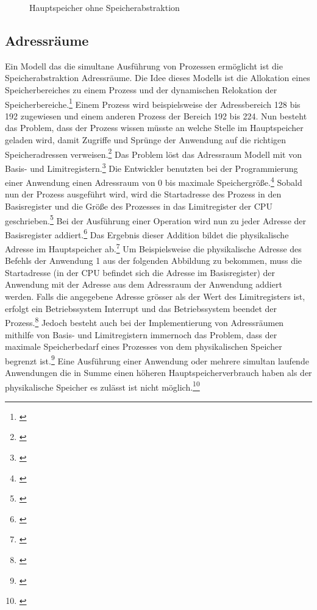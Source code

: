 \begin{figure}[htb]
	\centering
	\caption{Hauptspeicher ohne Speicherabstraktion}
\end{figure}


\subsection{Adressr\"{a}ume}
\label{subsec:Adressraeume}
Ein Modell das die simultane Ausführung von Prozessen ermöglicht ist die Speicherabstraktion Adressräume. Die Idee dieses Modells ist die Allokation eines Speicherbereiches zu einem Prozess und der dynamischen Relokation der Speicherbereiche.\footnote{\cite[S.~244]{Tanenbaum.2016}} Einem Prozess wird beispielsweise der Adressbereich 128 bis 192 zugewiesen und einem anderen Prozess der Bereich 192 bis 224. Nun besteht das Problem, dass der Prozess wissen müsste an welche Stelle im Hauptspeicher geladen wird, damit Zugriffe und Sprünge der Anwendung auf die richtigen Speicheradressen verweisen.\footnote{\cite[S.~244]{Tanenbaum.2016}} Das Problem löst das Adressraum Modell mit von Basis- und Limitregistern.\footnote{\cite[S.~244]{Tanenbaum.2016}} Die Entwickler benutzten bei der Programmierung einer Anwendung einen Adressraum von 0 bis maximale Speichergröße.\footnote{\cite[S.~244]{Tanenbaum.2016}} Sobald nun der Prozess ausgeführt wird, wird die Startadresse des Prozess in den Basisregister und die Größe des Prozesses in das Limitregister der CPU geschrieben.\footnote{\cite[S.~244]{Tanenbaum.2016}} Bei der Ausführung einer Operation wird nun zu jeder Adresse der Basisregister addiert.\footnote{\cite[S.~244]{Tanenbaum.2016}} Das Ergebnis dieser Addition bildet die physikalische Adresse im Hauptspeicher ab.\footnote{\cite[S.~244]{Tanenbaum.2016}} Um Beispielsweise die physikalische Adresse des Befehls der Anwendung 1 aus der folgenden Abbildung zu bekommen, muss die Startadresse (in der CPU befindet sich die Adresse im Basisregister) der Anwendung mit der Adresse aus dem Adressraum der Anwendung addiert werden. Falls die angegebene Adresse grösser als der Wert des Limitregisters ist, erfolgt ein Betriebssystem Interrupt und das Betriebssystem beendet der Prozess.\footnote{\cite[S.~244]{Tanenbaum.2016}} Jedoch besteht auch bei der Implementierung von Adressräumen mithilfe von Basis- und Limitregistern immernoch das Problem, dass der maximale Speicherbedarf eines Prozesses von dem physikalischen Speicher begrenzt ist.\footnote{\cite[S.~244]{Tanenbaum.2016}} Eine Ausführung einer Anwendung oder mehrere simultan laufende Anwendungen die in Summe einen höheren Hauptspeicherverbrauch haben als der physikalische Speicher es zulässt ist nicht möglich.\footnote{\cite[S.~244]{Tanenbaum.2016}}

